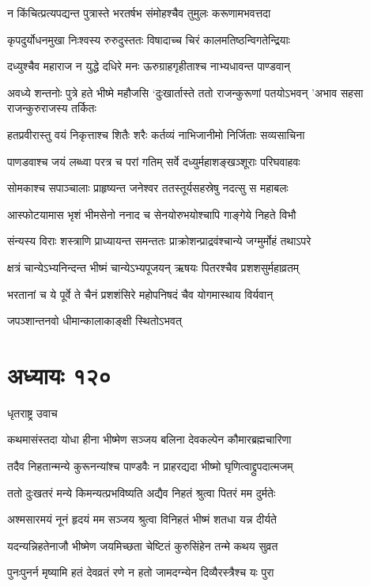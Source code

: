 \twolineshloka
{न किंचित्प्रत्यपद्यन्त पुत्रास्ते भरतर्षभ}
{संमोहश्चैव तुमुलः करूणामभवत्तदा}


\twolineshloka
{कृपदुर्योधनमुखा निःश्वस्य रुरुदुस्ततः}
{विषादाच्च चिरं कालमतिष्ठन्विगतेन्द्रियाः}


\twolineshloka
{दध्युश्चैव महाराज न युद्धे दधिरे मनः}
{ऊरुग्राहगृहीताश्च नाभ्यधावन्त पाण्डवान्}


\threelineshloka
{अवध्ये शन्तनोः पुत्रे हते भीष्मे महौजसि}
{`दुःखार्तास्ते ततो राजन्कुरूणां पतयोऽभवन्}
{'अभाव सहसा राजन्कुरुराजस्य तर्कितः}


\twolineshloka
{हतप्रवीरास्तु वयं निकृत्ताश्च शितैः शरैः}
{कर्तव्यं नाभिजानीमो निर्जिताः सव्यसाचिना}


\twolineshloka
{पाणडवाश्च जयं लब्ध्वा परत्र च परां गतिम्}
{सर्वे दध्युर्महाशङ्खञ्शूराः परिघवाहवः}


\twolineshloka
{सोमकाश्च सपाञ्चालाः प्राहृष्यन्त जनेश्वर}
{ततस्तूर्यसहस्रेषु नदत्सु स महाबलः}


\twolineshloka
{आस्फोटयामास भृशं भीमसेनो ननाद च}
{सेनयोरुभयोश्चापि गाङ्गेये निहते विभौ}


\twolineshloka
{संन्यस्य विराः शस्त्राणि प्राध्यायन्त समन्ततः}
{प्राक्रोशन्प्राद्रवंश्चान्ये जग्मुर्मोहं तथाऽपरे}


\twolineshloka
{क्षत्रं चान्येऽभ्यनिन्दन्त भीष्मं चान्येऽभ्यपूजयन्}
{ऋषयः पितरश्चैव प्रशशसुर्महाव्रतम्}


\twolineshloka
{भरतानां च ये पूर्वे ते चैनं प्रशशंसिरे}
{महोपनिषदं चैव योगमास्थाय विर्यवान्}


जपञ्शान्तनवो धीमान्कालाकाङ्क्षी स्थितोऽभवत्
\chapter{अध्यायः १२०}
\twolineshloka
{धृतराष्ट्र उवाच}
{}


\twolineshloka
{कथमासंस्तदा योधा हीना भीष्मेण सञ्जय}
{बलिना देवकल्पेन कौमारब्रह्मचारिणा}


\twolineshloka
{तदैव निहतान्मन्ये कुरूनन्यांश्च पाण्डवैः}
{न प्राहरद्यदा भीष्मो घृणित्वाद्द्रुपदात्मजम्}


\twolineshloka
{ततो दुःखतरं मन्ये किमन्यत्प्रभविष्यति}
{अद्यैव निहतं श्रुत्वा पितरं मम दुर्मतेः}


\twolineshloka
{अश्मसारमयं नूनं हृदयं मम सञ्जय}
{श्रुत्वा विनिहतं भीष्मं शतधा यन्न दीर्यते}


\twolineshloka
{यदन्यन्निहतेनाजौ भीष्मेण जयमिच्छता}
{चेष्टितं कुरुसिंहेन तन्मे कथय सुव्रत}


\twolineshloka
{पुनःपुनर्न मृष्यामि हतं देवव्रतं रणे}
{न हतो जामदग्न्येन दिव्यैरस्त्रैश्च यः पुरा}



